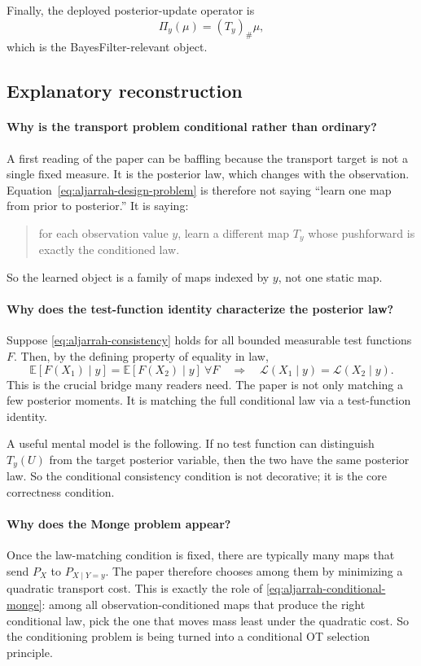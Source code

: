 \documentclass[11pt]{report}
\newcommand{\E}{\mathbb{E}}
\newcommand{\pushf}[2]{\left(#1\right)_{\#} #2}
\begin{document}
Finally, the deployed posterior-update operator is
\begin{equation}
\Pi_y(\mu)=\pushf{T_y}{\mu},
\label{eq:aljarrah-posterior-map}
\end{equation}
which is the BayesFilter-relevant object.

\subsection*{Explanatory reconstruction}

\paragraph{Why is the transport problem conditional rather than ordinary?}
A first reading of the paper can be baffling because the transport target is not a
single fixed measure.  It is the posterior law, which changes with the
observation.  Equation~\eqref{eq:aljarrah-design-problem} is therefore not saying
``learn one map from prior to posterior.''  It is saying:
\begin{quote}
for each observation value $y$, learn a different map $T_y$ whose pushforward is
exactly the conditioned law.
\end{quote}
So the learned object is a family of maps indexed by $y$, not one static map.

\paragraph{Why does the test-function identity characterize the posterior law?}
Suppose \eqref{eq:aljarrah-consistency} holds for all bounded measurable test
functions $F$.  Then, by the defining property of equality in law,
\begin{equation}
\E[F(X_1)\mid y]=\E[F(X_2)\mid y]\ \forall F
\quad\Longrightarrow\quad
\mathcal L(X_1\mid y)=\mathcal L(X_2\mid y).
\label{eq:test-function-law-identity}
\end{equation}
This is the crucial bridge many readers need.  The paper is not only matching a
few posterior moments.  It is matching the full conditional law via a test-function
identity.

A useful mental model is the following.  If no test function can distinguish
$T_y(U)$ from the target posterior variable, then the two have the same posterior
law.  So the conditional consistency condition is not decorative; it is the core
correctness condition.

\paragraph{Why does the Monge problem appear?}
Once the law-matching condition is fixed, there are typically many maps that send
$P_X$ to $P_{X\mid Y=y}$.  The paper therefore chooses among them by minimizing a
quadratic transport cost.  This is exactly the role of
\eqref{eq:aljarrah-conditional-monge}: among all observation-conditioned maps that
produce the right conditional law, pick the one that moves mass least under the
quadratic cost.  So the conditioning problem is being turned into a conditional OT
selection principle.
\end{document}
